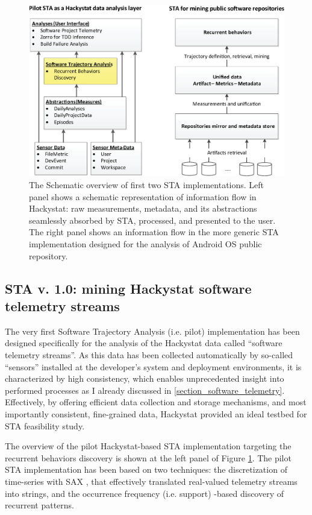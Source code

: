 \begin{figure}[t]
   \centering
   \includegraphics[width=150mm]{figures/STA12-schema-draft.eps}
   \caption{The Schematic overview of first two STA implementations. 
   Left panel shows a schematic representation of information flow in Hackystat: raw measurements, metadata, and its 
   abstractions seamlessly absorbed by STA, processed, and presented to the user.
   The right panel shows an information flow in the more generic STA implementation designed for the analysis of 
   Android OS public repository.}
   \label{fig:STA12-schema}
\end{figure}

\subsection{STA v. 1.0: mining Hackystat software telemetry streams}
The very first Software Trajectory Analysis (i.e. pilot) implementation has been designed specifically for the analysis 
of the Hackystat data called ``software telemetry streams''. As this data has been collected automatically by so-called 
``sensors'' installed at the developer's system and deployment environments, it is characterized by high consistency, 
which enables unprecedented insight into performed processes as I already discussed in \ref{section_software_telemetry}. 
Effectively, by offering efficient data collection and storage mechanisms, and most importantly consistent, fine-grained data, 
Hackystat provided an ideal testbed for STA feasibility study.

The overview of the pilot Hackystat-based STA implementation targeting the recurrent behaviors discovery is shown 
at the left panel of Figure  \ref{fig:STA12-schema}.
The pilot STA implementation has been based on two techniques: the discretization of time-series with SAX \cite{sax}, 
that effectively translated real-valued telemetry streams into strings, and the occurrence frequency (i.e. support) -based 
discovery of recurrent patterns.

